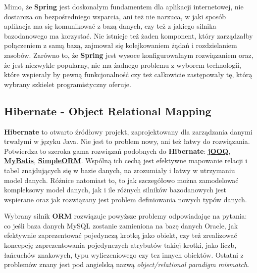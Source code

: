 Mimo, że \textbf{Spring} jest doskonałym fundamentem dla aplikacji internetowej, nie dostarcza on bezpośredniego wsparcia, ani też nie narzuca, w jaki sposób aplikacja ma się komunikować z bazą danych, czy też z jakiego silnika bazodanowego ma korzystać. Nie istnieje też żaden komponent, który zarządzałby połączeniem z samą bazą, zajmował się kolejkowaniem żądań i rozdzielaniem zasobów. Zarówno to, że \textbf{Spring} jest wysoce konfigurowalnym rozwiązaniem oraz, że jest niezwykle popularny, nie ma żadnego problemu z wyborem technologii, które wspierały by pewną funkcjonalność czy też całkowicie zastępowały tę, którą wybrany szkielet programistyczny oferuje.  

\subsection{Hibernate - Object Relational Mapping}
\label{tech:hibernate}
	\textbf{Hibernate} to otwarto źródłowy projekt, zaprojektowany dla zarządzania danymi trwałymi w języku Java. Nie jest to problem nowy, ani też łatwy do rozwiązania. Potwierdza to szeroka gama rozwiązań podobnych do \textbf{Hibernate}: \href{http://www.jooq.org/}{\textbf{jOOQ}}, \href{http://blog.mybatis.org/}{\textbf{MyBatis}}, \href{http://www.simpleorm.org/}{\textbf{SimpleORM}}. Wspólną ich cechą jest efektywne mapowanie relacji i tabel znajdujących się w bazie danych, na zrozumiały i łatwy w utrzymaniu model danych. Różnice natomiast to, to jak szczegółowo można zamodelować kompleksowy model danych, jak i ile różnych silników bazodanowych jest wspierane oraz jak rozwiązany jest problem definiowania nowych typów danych. 
	
	Wybrany silnik \textbf{ORM} rozwiązuje powyższe problemy odpowiadając na pytania: co jeśli baza danych MySQL zostanie zamieniona na bazę danych Oracle, jak efektywnie zaprezentować pojedynczą krotką jako obiekt, czy też zrealizować koncepcję zaprezentowania pojedynczych atrybutów takiej krotki, jako liczb, łańcuchów znakowych, typu wyliczeniowego czy tez innych obiektów. Ostatni z problemów znany jest pod angielską nazwą \textit{object/relational paradigm mismatch}. 
	
